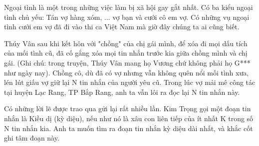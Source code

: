 Ngoại tình là một trong những việc làm bị xã hội gay gắt nhất. Có ba kiểu ngoại tình chủ yếu: Tán vợ hàng xóm, ... vợ bạn và cưới cô em vợ. Có những vụ ngoại tình cưới em vợ đã đi vào thi ca Việt Nam mà giờ đây chúng ta ai cũng biết.

Thúy Vân sau khi kết hôn với "chồng" của chị gái mình, để xóa đi mọi dấu tích của mối tình cũ, đã cố gắng xóa mọi tin nhắn trước kia giữa chồng mình và chị gái. (Ghi chú: trong truyện, Thúy Vân mang họ Vương chứ không phải họ G*** như ngày nay). Chồng cô, dù đã có vợ nhưng vẫn không quên nổi mối tình xưa, lén lút giấu vợ giữ lại N tin nhắn của người yêu cũ. Trong lúc vợ mải mê công tác tại huyện Lạc Rang, TP Bắp Rang, anh ta vẫn lôi ra đọc lại N tin nhắn này.

Có những lời lẽ được trao qua gửi lại rất nhiều lần. Kim Trọng gọi một đoạn tin nhắn là Kiều dị (kỳ diệu), nếu như nó là xâu con liên tiếp của ít nhất K trong số N tin nhắn kia. Anh ta muốn tìm ra đoạn tin nhắn kỳ diệu dài nhất, và khắc cốt ghi tâm đoạn này.